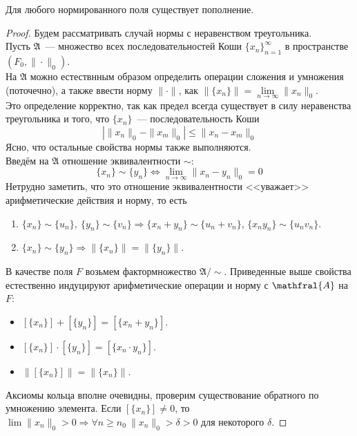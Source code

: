 \documentclass[11pt]{article}
\begin{document}
    \begin{theorem}
        Для любого нормированного поля существует пополнение.
    \end{theorem}
    \begin{proof}
        Будем рассматривать случай нормы с неравенством треугольника. \\
        Пусть $\mathfrak{A}$~--- множество всех последовательностей Коши $\{ x_n \}_{n = 1}^{\infty}$ в пространстве
        $(F_0, \| \cdot \|_0)$.\\
        На $\mathfrak{A}$ можно естествнным образом определить операции сложения и умножения (поточечно), а также ввести норму $\| \cdot \|$, как
        $\| \{ x_n \} \| = \lim\limits_{n \to \infty} \| x_n \|_{0}$.\\
        Это определение корректно, так как предел всегда существует в силу неравенства треугольника и того, что $\{ x_n \}$~---
        последовательность Коши
        \[ |\| x_n \|_0 - \| x_m \|_0 | \le \| x_n - x_m \|_0 \]
        Ясно, что остальные свойства нормы также выполняются. \\

        Введём на $\mathfrak{A}$  отношение эквивалентности $\sim$:
        \[ \{ x_n \} \sim \{ y_n \} \Leftrightarrow \lim\limits_{n \to \infty} \| x_n - y_n \|_0  = 0 \]
        Нетрудно заметить, что это отношение эквивалентности <<уважает>> арифметические действия и норму, то есть
        \begin{enumerate}
            \item $\{ x_n \} \sim \{ u_n \}, \ \{ y_n \} \sim \{ v_n \} \Rightarrow \{ x_n + y_n \} \sim \{ u_n + v_n \}$, $\{ x_n y_n \} \sim \{ u_n v_n \}$.
            \item $\{ x_n \} \sim \{ y_n \} \Rightarrow \| \{ x_n \} \| = \| \{ y_n \} \|$.
        \end{enumerate}

        В качестве поля $F$ возьмем фактормножество $\mathfrak{A}/\sim$. Приведенные выше свойства естественно индуцируют арифметические операции и норму
        с $\mathfral{A}$ на $F$:
        \begin{itemize}
            \item $[\{ x_n \}] + [\{ y_n \}] = [\{ x_n + y_n \}]$.
            \item $[\{ x_n \}] \cdot [\{ y_n \}] = [\{ x_n \cdot y_n \}]$.
            \item $\| [\{ x_n \}] \| = \| \{ x_n \}\|$.
        \end{itemize}
        Аксиомы кольца вполне очевидны, проверим существование обратного по умножению элемента.
        Если $[\{ x_n \}] \neq 0$, то $\lim \| x_n \|_0 > 0 \Rightarrow \forall n \ge n_0 \ \| x_n \|_0 > \delta > 0$ для
        некоторого $\delta$.


\end{proof}
\end{document}
